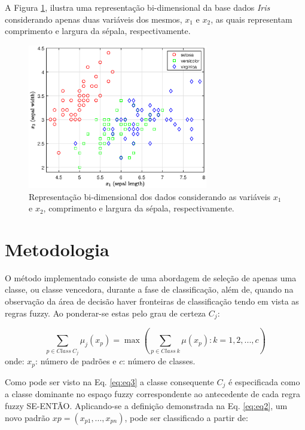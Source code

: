 \documentclass[12pt,a4paper]{article}
\numberwithin{equation}{section}
\begin{document}
A Figura \ref{fig:data}, ilustra uma representação bi-dimensional da base dados \textit{Iris} considerando apenas duas variáveis dos mesmos, $x_1$ e $x_2$, as quais representam comprimento e largura da sépala, respectivamente.

\begin{figure}[ht]
\centering
\includegraphics[width=0.7\textwidth]{figures/data.eps}
\caption{Representação bi-dimensional dos dados considerando as variáveis $x_1$ e $x_2$, comprimento e largura da sépala, respectivamente.}
\label{fig:data}
\end{figure}

\section{Metodologia}

O método implementado consiste de uma abordagem de seleção de apenas uma classe, ou classe vencedora, durante a fase de classificação, além de, quando na observação da área de decisão haver fronteiras de classificação tendo em vista as regras fuzzy. Ao ponderar-se estas pelo grau de certeza $C_{j}$:

\begin{equation} \label{eq:eq3}
\sum_{p\in Class~C_{j}} \mu_{j}(x_p)=\max(\sum_{p\in Class~k}\mu(x_{p}):k=1,2,...,c)
\end{equation}
onde: $x_{p}$: número de padrões e $c$: número de classes.

Como pode ser visto na Eq. \eqref{eq:eq3} a classe consequente $C_{j}$ é especificada como a classe dominante no espaço fuzzy correspondente ao antecedente de cada regra fuzzy SE-ENTÃO. Aplicando-se a definição demonstrada na Eq. \eqref{eq:eq2}, um novo padrão $x{p}=(x_{p1},...,x_{pn})$, pode ser classificado a partir de:
\end{document}
